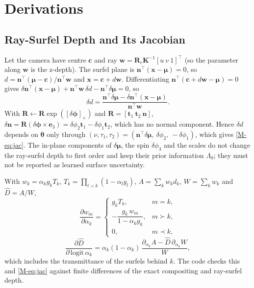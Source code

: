 \section{Derivations}
\label{sup:derivations}

\subsection{Ray-Surfel Depth and Its Jacobian}
Let the camera have centre $\mathbf{c}$ and ray $\mathbf{w}=\mathbf{R}_c\mathbf{K}^{-1}[u\ v\ 1]^{\top}$
(so the parameter along $\mathbf{w}$ is the z-depth). The surfel plane is
$\mathbf{n}^{\top}(\mathbf{x}-\boldsymbol\mu)=0$, so $d=\mathbf{n}^{\top}(\boldsymbol\mu-\mathbf{c})/\mathbf{n}^{\top}\mathbf{w}$
and $\mathbf{x}=\mathbf{c}+d\mathbf{w}$. Differentiating
$\mathbf{n}^{\top}(\mathbf{c}+d\mathbf{w}-\boldsymbol\mu)=0$ gives
$\delta\mathbf{n}^{\top}(\mathbf{x}-\boldsymbol\mu)+\mathbf{n}^{\top}\mathbf{w}\,\delta d-\mathbf{n}^{\top}\delta\boldsymbol\mu=0$, so
\[
\delta d=\frac{\mathbf{n}^{\top}\delta\boldsymbol\mu-\delta\mathbf{n}^{\top}(\mathbf{x}-\boldsymbol\mu)}{\mathbf{n}^{\top}\mathbf{w}} .
\]
With $\mathbf{R}\leftarrow\mathbf{R}\exp([\delta\boldsymbol\phi]_\times)$ and $\mathbf{R}=[\mathbf{t}_1\ \mathbf{t}_2\ \mathbf{n}]$,
$\delta\mathbf{n}=\mathbf{R}(\delta\boldsymbol\phi\times\mathbf{e}_3)=\delta\phi_2\mathbf{t}_1-\delta\phi_1\mathbf{t}_2$, which has no normal
component. Hence $\delta d$ depends on $\boldsymbol\theta$ only through
$(\nu,\tau_1,\tau_2)=(\mathbf{n}^{\top}\delta\boldsymbol\mu,\ \delta\phi_2,\ -\delta\phi_1)$, which gives \eqref{M-eq:jac}.
The in-plane components of $\delta\boldsymbol\mu$, the spin $\delta\phi_3$ and the scales do not change
the ray-surfel depth to first order and keep their prior information $\Lambda_0$; they must not be
reported as learned surface uncertainty.

 With $w_k=\alpha_kg_kT_k$, $T_k=\prod_{l\prec k}(1-\alpha_lg_l)$, $A=\sum_kw_kd_k$,
$W=\sum_kw_k$ and $\hat D=A/W$,
\[
\frac{\partial w_m}{\partial\alpha_k}=\begin{cases}g_kT_k,&m=k,\\ -\dfrac{g_k\,w_m}{1-\alpha_kg_k},&m\succ k,\\ 0,&m\prec k,\end{cases}
\]
\[
\frac{\partial\hat D}{\partial\,\mathrm{logit}\,\alpha_k}=\alpha_k(1-\alpha_k)\,\frac{\partial_{\alpha_k}A-\hat D\,\partial_{\alpha_k}W}{W},
\]
which includes the transmittance of the surfels behind $k$. The code checks this and \eqref{M-eq:jac}
against finite differences of the exact compositing and ray-surfel depth.

